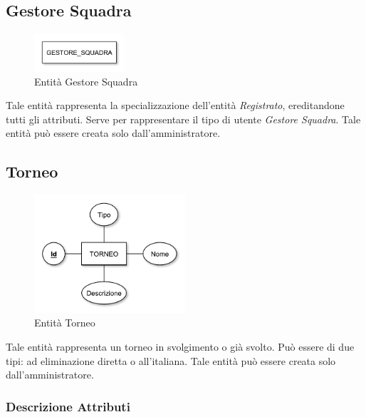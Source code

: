 	\subsection{Gestore Squadra}
	
		\begin{figure}[h]
			\centering
			\includegraphics[width=0.3\textwidth]
			{immagini/05-gestore-squadra}
			
			\caption{Entità Gestore Squadra}
		\end{figure}
		
		Tale entità rappresenta la specializzazione dell'entità \emph{Registrato}, ereditandone tutti gli attributi. Serve per rappresentare il tipo di utente \emph{Gestore Squadra}. Tale entità può essere creata solo dall'amministratore.
	
	\subsection{Torneo}
	
		\begin{figure}[h]
			\centering
			\includegraphics[width=0.5\textwidth]
			{immagini/06-torneo}
			
			\caption{Entità Torneo}
		\end{figure}
		
		Tale entità rappresenta un torneo in svolgimento o già svolto. Può essere di due tipi: ad eliminazione diretta o all'italiana. Tale entità può essere creata solo dall'amministratore.
		
		\subsubsection*{Descrizione Attributi}
		
